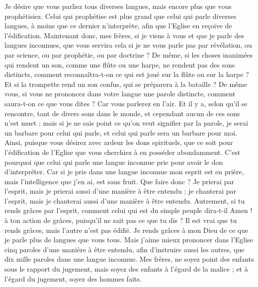 \begin{multicols}{2}
Je désire que vous parliez tous diverses langues, mais encore plus que vous prophétisiez. Celui qui prophétise est plus grand que celui qui parle diverses langues, à moins que ce dernier n’interprète, afin que l'Eglise en reçoive de l'édification.
Maintenant donc, mes frères, si je viens à vous et que je parle des langues inconnues, que vous servira cela si je ne vous parle pas par révélation, ou par science, ou par prophétie, ou par doctrine ?
De même, si les choses inanimées qui rendent un son, comme une flûte ou une harpe, ne rendent pas des sons distincts, comment reconnaîtra-t-on ce qui est joué sur la flûte ou sur la harpe ?
Et si la trompette rend un son confus, qui se préparera à la bataille ?
De même vous, si vous ne prononcez dans votre langue une parole distincte, comment saura-t-on ce que vous dites ? Car vous parlerez en l'air.
Et il y a, selon qu'il se rencontre, tant de divers sons dans le monde, et cependant aucun de ces sons n'est muet ;
mais si je ne sais point ce qu'on veut signifier par la parole, je serai un barbare pour celui qui parle, et celui qui parle sera un barbare pour moi.
Ainsi, puisque vous désirez avec ardeur les dons spirituels, que ce soit pour l’édification de l'Eglise que vous cherchiez à en posséder abondamment.
C'est pourquoi que celui qui parle une langue inconnue prie pour avoir le don d’interpréter.
Car si je prie dans une langue inconnue mon esprit est en prière, mais l'intelligence que j'en ai, est sans fruit.
Que faire donc ? Je prierai par l’esprit, mais je prierai aussi d'une manière à être entendu ; je chanterai par l’esprit, mais je chanterai aussi d'une manière à être entendu.
Autrement, si tu rends grâces par l’esprit, comment celui qui est du simple peuple dira-t-il Amen ! à ton action de grâces, puisqu'il ne sait pas ce que tu dis ?
Il est vrai que tu rends grâces, mais l’autre n’est pas édifié.
Je rends grâces à mon Dieu de ce que je parle plus de langues que vous tous.
Mais j'aime mieux prononcer dans l'Eglise cinq paroles d'une manière à être entendu, afin d’instruire aussi les autres, que dix mille paroles dans une langue inconnue.
Mes frères, ne soyez point des enfants sous le rapport du jugement, mais soyez des enfants à l’égard de la malice ; et à l'égard du jugement, soyez des hommes faits.

\end{multicols}
